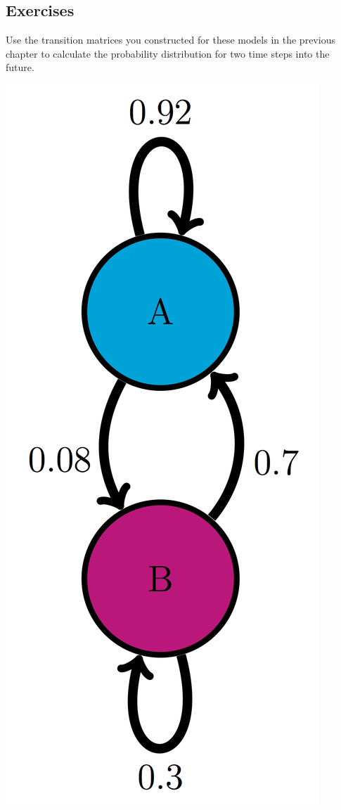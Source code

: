 \documentclass[
]{book}
\theoremstyle{definition}
\theoremstyle{definition}
\theoremstyle{definition}
\theoremstyle{remark}
\begin{document}
\hypertarget{exercises-29}{%
\subsection{Exercises}\label{exercises-29}}

Use the transition matrices you constructed for these models in the previous chapter to calculate the probability distribution for two time steps into the future.

\includegraphics{ch10/AB_trans_diag.png}
\end{document}
